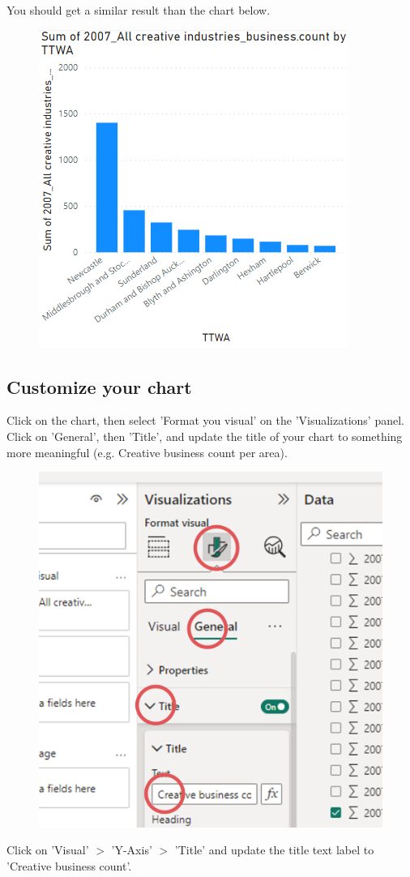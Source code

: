 \documentclass[11pt]{article}
\begin{document}
You should get a similar result than the chart below.

\begin{figure}[h!]
    \centering
    \includegraphics[width=.5\linewidth]{img/firstChart.png}
\end{figure}

\subsection{Customize your chart}

Click on the chart, then select 'Format you visual' on the 'Visualizations' panel. Click on 'General', then 'Title', and update the title of your chart to something more meaningful (e.g. Creative business count per area).\\

\begin{figure}[h!]
    \centering
    \includegraphics[width=.5\linewidth]{img/customizeChart.png}
\end{figure}

Click on 'Visual' $>$ 'Y-Axis' $>$ 'Title' and update the title text label to 'Creative business count'.\\
\\
\end{document}
